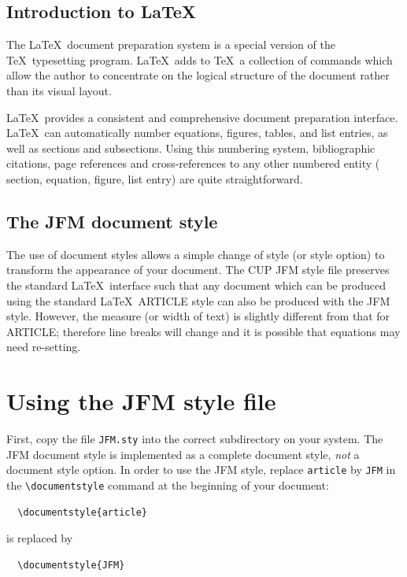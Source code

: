 \subsection{Introduction to \LaTeX}

The \LaTeX\ document preparation system is a special version of the
\TeX\ typesetting program.
 \LaTeX\ adds to \TeX\ a collection of commands which allow the author
to concentrate on the logical structure of the document rather than its
visual layout.

\LaTeX\ provides a consistent and comprehensive document preparation
interface.
\LaTeX\ can automatically number equations, figures,
tables, and list entries, as well as sections and
subsections.
Using this numbering system, bibliographic citations, page references
and cross-references to any other numbered entity (\eg
section, equation, figure, list entry) are quite straightforward.

\subsection{The JFM document style}

The use of document styles allows a simple change of style (or style option) to
transform the appearance of your document.
The CUP JFM style file preserves the standard \LaTeX\ interface such that any
document which can be  produced using the standard \LaTeX\ ARTICLE style
can also be produced with the JFM style.
However, the measure (or width of text) is slightly different from that
for ARTICLE; therefore line breaks will change and it is possible that
equations may need re-setting.


\section{Using the JFM style file}

First, copy the file \verb"JFM.sty" into the correct subdirectory on your
system.
The JFM document style is implemented as a complete document style, {\em not\/}
a document style option.
In order to use the JFM style, replace \verb"article" by \verb"JFM" in the
\verb"\documentstyle" command at the beginning of your document:

\smallskip
\begin{verbatim}
  \documentstyle{article}
\end{verbatim}
\smallskip

\noindent
is replaced by

\smallskip
\begin{verbatim}
  \documentstyle{JFM}
\end{verbatim}
\smallskip

